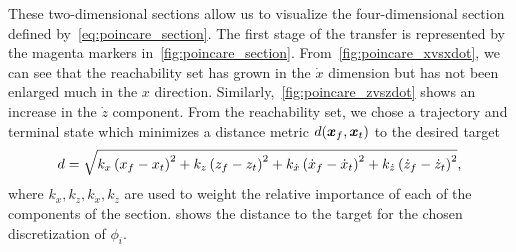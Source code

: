 These two-dimensional sections allow us to visualize the four-dimensional \Poincare section defined by~\cref{eq:poincare_section}.
The first stage of the transfer is represented by the magenta markers in~\cref{fig:poincare_section}.
From~\cref{fig:poincare_xvsxdot}, we can see that the reachability set has grown in the \( \dot{x} \) dimension but has not been enlarged much in the \( x \) direction.
Similarly,~\cref{fig:poincare_zvszdot} shows an increase in the \( \dot{z} \) component.
From the reachability set, we chose a trajectory and terminal state which minimizes a distance metric \( d(\bm{x}_f,\bm{x}_t) \) to the desired target
\begin{align}\label{eq:reach_dist}
    d = \sqrt{k_x \left( x_f - x_t  \right)^2 + k_z \left( z_f - z_t  \right)^2 + k_{\dot{x}}\left( \dot{x}_f - \dot{x}_t  \right)^2 + k_{\dot{z}}\left( \dot{z}_f - \dot{z}_t  \right)^2} ,
\end{align}
where \( k_x, k_z, k_{\dot{x}}, k_{\dot{z}} \) are used to weight the relative importance of each of the components of the \Poincare section.
 shows the distance to the target for the chosen discretization of \( \phi_i \).

